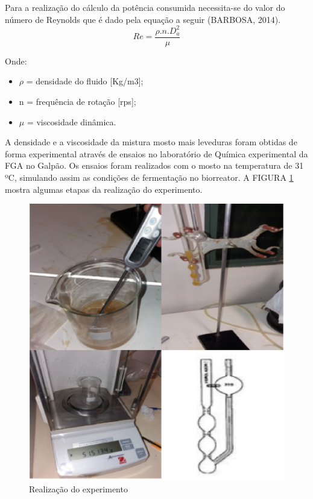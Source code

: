 Para a realização do cálculo da potência consumida necessita-se do valor do número de Reynolds que é dado pela equação a seguir (BARBOSA, 2014).
\[Re = \frac{\rho.n.D_{a}^2}{\mu}\]

Onde:

\begin{itemize}
	\item \(\rho\) = densidade do fluido [Kg/m3];
	\item n = frequência de rotação [rps];
	\item \(\mu\) = viscosidade dinâmica.
\end{itemize}

A densidade e a viscosidade da mistura mosto mais leveduras foram obtidas de forma experimental através de ensaios no laboratório de Química experimental da FGA no Galpão. Os ensaios foram realizados com o mosto na temperatura de 31 ºC, simulando assim as condições de fermentação no biorreator. A FIGURA \ref{equipamentos} mostra algumas etapas da realização do experimento.

\begin{figure}[h]
 \centering
 \includegraphics[keepaspectratio=true,scale=0.4]{figuras/equipamentos.eps}
 \caption{Realização do experimento}
 \label{equipamentos}
\end{figure}

